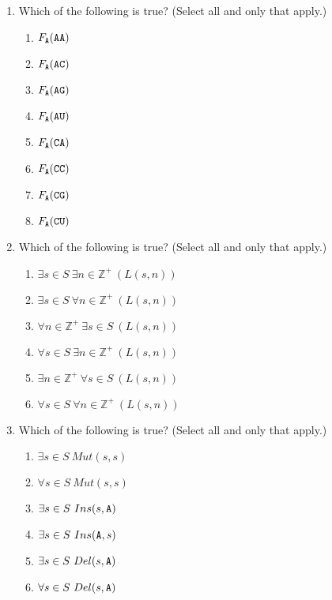 \begin{enumerate}
\item Which of the following is true? (Select  all and only that apply.)
 \begin{enumerate}
    \item $F_{\texttt{A}} ( \texttt{A}\texttt{A})$
    \item $F_{\texttt{A}} ( \texttt{A}\texttt{C})$
    \item $F_{\texttt{A}} ( \texttt{A}\texttt{G})$
    \item $F_{\texttt{A}} ( \texttt{A}\texttt{U})$
    \item $F_{\texttt{A}} ( \texttt{C}\texttt{A})$
    \item $F_{\texttt{A}} ( \texttt{C}\texttt{C})$
    \item $F_{\texttt{A}} ( \texttt{C}\texttt{G})$
    \item $F_{\texttt{A}} ( \texttt{C}\texttt{U})$
 \end{enumerate}    
\item Which of the following is true? (Select  all and only that apply.)
 \begin{enumerate}
    \item $\exists s \in S ~\exists n \in \mathbb{Z}^+ ~(L(s,n))$
    \item $\exists s \in S ~\forall n \in \mathbb{Z}^+ ~(L(s,n))$
    \item $\forall n \in \mathbb{Z}^+~\exists s \in S ~(L(s,n))$
    \item $\forall s \in S ~\exists n \in \mathbb{Z}^+ ~(L(s,n))$
    \item $\exists n \in \mathbb{Z}^+ ~\forall s \in S ~(L(s,n))$
    \item $\forall s \in S ~\forall n \in \mathbb{Z}^+ ~(L(s,n))$
 \end{enumerate} 
\item Which of the following is true? (Select  all and only that apply.)
 \begin{enumerate}
    \item $\exists s \in S ~Mut(s,s)$
    \item $\forall s \in S ~Mut(s,s)$
    \item $\exists s \in S ~Ins(s,\texttt{A})$
    \item $\exists s \in S ~Ins(\texttt{A},s)$
    \item $\exists s \in S ~Del(s,\texttt{A})$
    \item $\forall s \in S ~Del(s,\texttt{A})$
 \end{enumerate} 
\end{enumerate}